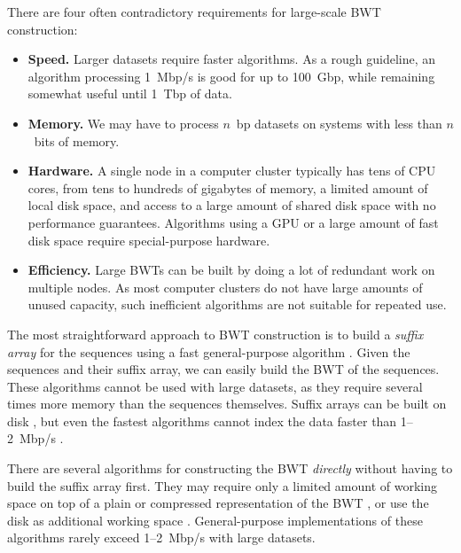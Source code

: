 \documentclass[smallabstract,smallcaptions]{dccpaper}
\newcommand{\BWT}{\textsf{BWT}}
\begin{document}
There are four often contradictory requirements for large-scale \BWT{} construction:
\begin{itemize}

\item \textbf{Speed.} Larger datasets require faster algorithms. As a rough guideline, an algorithm processing 1~Mbp/s is good for up to 100~Gbp, while remaining somewhat useful until 1~Tbp of data.

\item \textbf{Memory.} We may have to process $n$~bp datasets on systems with less than $n$~bits of memory.

\item \textbf{Hardware.} A single node in a computer cluster typically has tens of CPU cores, from tens to hundreds of gigabytes of memory, a limited amount of local disk space, and access to a large amount of shared disk space with no performance guarantees. Algorithms using a GPU or a large amount of fast disk space require special-purpose hardware.

\item \textbf{Efficiency.} Large \BWT{}s can be built by doing a lot of redundant work on multiple nodes. As most computer clusters do not have large amounts of unused capacity, such inefficient algorithms are not suitable for repeated use.

\end{itemize}

The most straightforward approach to \BWT{} construction is to build a \emph{suffix array} for the sequences using a fast general-purpose algorithm \cite{Mori2008,Nong2011}. Given the sequences and their suffix array, we can easily build the \BWT{} of the sequences. These algorithms cannot be used with large datasets, as they require several times more memory than the sequences themselves. Suffix arrays can be built on disk \cite{Gonnet1992}, but even the fastest algorithms cannot index the data faster than 1\nobreakdash--2~Mbp/s \cite{Bingmann2013,Kaerkkaeinen2014a,Nong2014,Nong2015,Kaerkkaeinen2015a,Liu2015a}.

There are several algorithms for constructing the \BWT{} \emph{directly} without having to build the suffix array first. They may require only a limited amount of working space on top of a plain or compressed representation of the \BWT{} \cite{Hon2007,Kaerkkaeinen2007,Siren2009,Okanohara2009}, or use the disk as additional working space \cite{Ferragina2012,Beller2013}. General-purpose implementations of these algorithms rarely exceed 1\nobreakdash--2~Mbp/s with large datasets.
\end{document}
